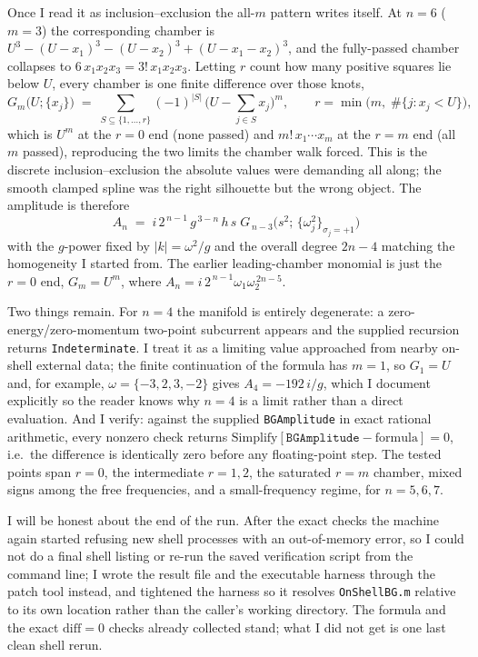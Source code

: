 \documentclass{article}
\begin{document}
Once I read it as inclusion--exclusion the all-$m$ pattern writes itself. At
$n=6$ ($m=3$) the corresponding chamber is
$U^3-(U-x_1)^3-(U-x_2)^3+(U-x_1-x_2)^3$, and the fully-passed chamber collapses to
$6\,x_1x_2x_3=3!\,x_1x_2x_3$. Letting $r$ count how many positive squares lie
below $U$, every chamber is one finite difference over those knots,
\[
G_m\big(U;\{x_j\}\big) \;=\; \sum_{S\subseteq\{1,\dots,r\}} (-1)^{|S|}\,
\Big(U-\sum_{j\in S} x_j\Big)^{m},
\qquad r=\min\big(m,\;\#\{j:x_j<U\}\big),
\]
which is $U^m$ at the $r=0$ end (none passed) and $m!\,x_1\cdots x_m$ at the
$r=m$ end (all $m$ passed), reproducing the two limits the chamber walk forced.
This is the discrete inclusion--exclusion the absolute values were demanding all
along; the smooth clamped spline was the right silhouette but the wrong object.
The amplitude is therefore
\[
\boxed{\;
A_n \;=\; i\,2^{\,n-1}\,g^{\,3-n}\,h\,s\;
G_{\,n-3}\!\big(s^2;\,\{\omega_j^2\}_{\sigma_j=+1}\big)\;}
\]
with the $g$-power fixed by $|k|=\omega^2/g$ and the overall degree $2n-4$
matching the homogeneity I started from. The earlier leading-chamber monomial is
just the $r=0$ end, $G_m=U^m$, where $A_n=i\,2^{\,n-1}\omega_1\omega_2^{\,2n-5}$.

Two things remain. For $n=4$ the manifold is entirely degenerate: a
zero-energy/zero-momentum two-point subcurrent appears and the supplied recursion
returns \texttt{Indeterminate}. I treat it as a limiting value approached from
nearby on-shell external data; the finite continuation of the formula has $m=1$,
so $G_1=U$ and, for example, $\omega=\{-3,2,3,-2\}$ gives $A_4=-192\,i/g$, which I
document explicitly so the reader knows why $n=4$ is a limit rather than a direct
evaluation. And I verify: against the supplied \texttt{BGAmplitude} in exact
rational arithmetic, every nonzero check returns
$\mathrm{Simplify}[\texttt{BGAmplitude}-\text{formula}]=0$, i.e.\ the difference is
identically zero before any floating-point step. The tested points span $r=0$,
the intermediate $r=1,2$, the saturated $r=m$ chamber, mixed signs among the free
frequencies, and a small-frequency regime, for $n=5,6,7$.

I will be honest about the end of the run. After the exact checks the machine
again started refusing new shell processes with an out-of-memory error, so I
could not do a final shell listing or re-run the saved verification script from
the command line; I wrote the result file and the executable harness through the
patch tool instead, and tightened the harness so it resolves \texttt{OnShellBG.m}
relative to its own location rather than the caller's working directory. The
formula and the exact $\mathrm{diff}=0$ checks already collected stand; what I did
not get is one last clean shell rerun.
\end{document}
